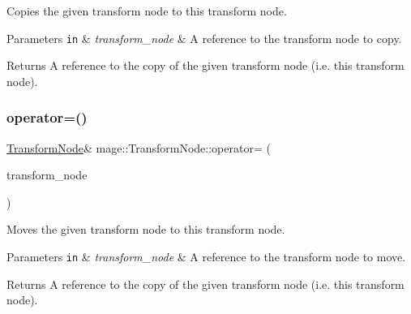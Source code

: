 Copies the given transform node to this transform node.


\begin{DoxyParams}[1]{Parameters}
\mbox{\tt in}  & {\em transform\+\_\+node} & A reference to the transform node to copy. \\
\hline
\end{DoxyParams}
\begin{DoxyReturn}{Returns}
A reference to the copy of the given transform node (i.\+e. this transform node). 
\end{DoxyReturn}
\hypertarget{classmage_1_1_transform_node_a48c94a56f7d6693a5b6ca61841084249}{}\label{classmage_1_1_transform_node_a48c94a56f7d6693a5b6ca61841084249} 
\subsubsection{\texorpdfstring{operator=()}{operator=()}\hspace{0.1cm}{\footnotesize\ttfamily [2/2]}}
{\footnotesize\ttfamily \hyperlink{classmage_1_1_transform_node}{Transform\+Node}\& mage\+::\+Transform\+Node\+::operator= (\begin{DoxyParamCaption}\item[{\hyperlink{classmage_1_1_transform_node}{Transform\+Node} \&\&}]{transform\+\_\+node }\end{DoxyParamCaption})\hspace{0.3cm}{\ttfamily [delete]}}

Moves the given transform node to this transform node.


\begin{DoxyParams}[1]{Parameters}
\mbox{\tt in}  & {\em transform\+\_\+node} & A reference to the transform node to move. \\
\hline
\end{DoxyParams}
\begin{DoxyReturn}{Returns}
A reference to the copy of the given transform node (i.\+e. this transform node). 
\end{DoxyReturn}
\hypertarget{classmage_1_1_transform_node_a8974e931f8fd7fb157ba1624405774d0}{}\label{classmage_1_1_transform_node_a8974e931f8fd7fb157ba1624405774d0} 
